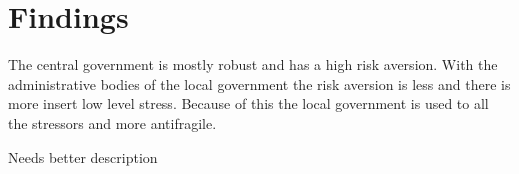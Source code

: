 \section{Findings}

The central government is mostly robust and has a high risk aversion. With the administrative bodies of the local government the risk aversion is less and there is more insert low level stress. Because of this the local government is used to all the stressors and more antifragile.

\begin{remark}
Needs better description
\end{remark}